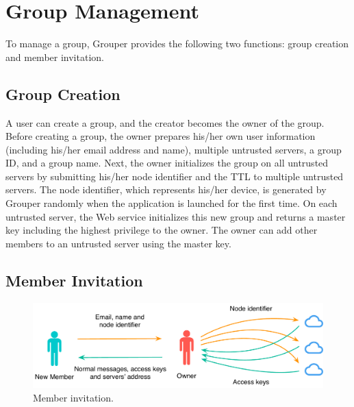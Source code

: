 \documentclass[a4paper,11pt]{report}
\begin{document}
\section{Group Management}  \label{section:group_management}

To manage a group, Grouper provides the following two functions: group creation and member invitation.

\subsection{Group Creation}

A user can create a group, and the creator becomes the owner of the group.  
Before creating a group, the owner prepares his/her own user information (including his/her email address and name), multiple untrusted servers, a group ID, and a group name. 
Next, the owner initializes the group on all untrusted servers by submitting his/her node identifier and the TTL to multiple untrusted servers. 
The node identifier, which represents his/her device, is generated by Grouper randomly when the application is launched for the first time. 
On each untrusted server, the Web service initializes this new group and returns a master key including the highest privilege to the owner. 
The owner can add other members to an untrusted server using the master key.

\subsection{Member Invitation}

\begin{figure}
	\centering
	\includegraphics[scale=0.55]{add_member}
	\caption{Member invitation.}
	\label{fig:add_member}
\end{figure}
\end{document}
